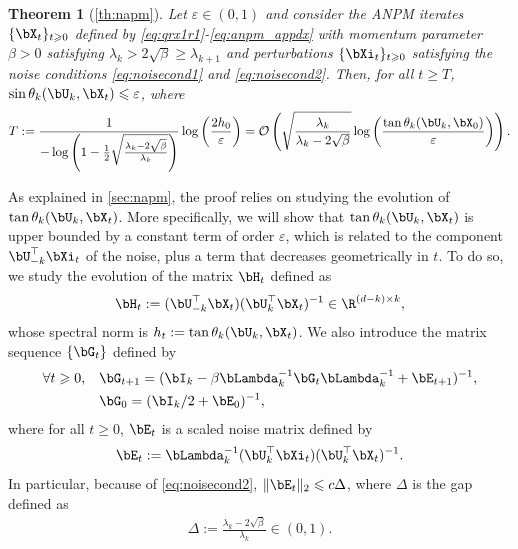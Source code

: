 \documentclass{article}
\theoremstyle{plain}
\newtheorem{theorem}{Theorem}[section]
\theoremstyle{definition}
\theoremstyle{remark}
\begin{document}
\begin{theorem}[\cref{th:napm}]\label{th:napm_apdx}
  Let $\varepsilon \in (0,1)$ and consider the ANPM iterates $\{\bX_t\}_{t\geqslant 0}$ defined by \eqref{eq:qrx1r1}-\eqref{eq:anpm_appdx} with momentum parameter $\beta > 0$ satisfying $\lambda_k > 2\sqrt{\beta} \geqslant \lambda_{k+1}$ and perturbations $\{\bXi_t\}_{t\geqslant 0}$ satisfying the noise conditions \eqref{eq:noisecond1} and \eqref{eq:noisecond2}. Then, for all $t \geqslant T$, $\sin\theta_k(\bU_k, \bX_t) \leqslant \varepsilon$, where
  \begin{align*}
      T := \frac{1}{-\log\left(1 - \frac{1}{2}\sqrt{\frac{\lambda_k-2\sqrt{\beta}}{\lambda_k}}\right)}\log\left(\frac{2h_0}{\varepsilon}\right) = \mathcal{O}\left(\sqrt{\frac{\lambda_k}{\lambda_k - 2\sqrt{\beta}}} \log\left(\frac{\tan\theta_k(\bU_k, \bX_0)}{\varepsilon}\right)\right).
  \end{align*}
\end{theorem}

As explained in \cref{sec:napm}, the proof relies on studying the evolution of $\tan\theta_k(\bU_k,\bX_t)$. More specifically, we will show that $\tan\theta_k(\bU_k,\bX_t)$ is upper bounded by a constant term of order $\varepsilon$, which is related to the component $\bU_{-k}^\top \bXi_t$ of the noise, plus a term that decreases geometrically in $t$. To do so, we study the evolution of the matrix $\bH_t$ defined as 
\begin{align}\label{eq:ht_def_appdx}
    \bH_t := (\bU_{-k}^\top \bX_t) (\bU_k^\top \bX_t)^{-1} \in \R^{(d-k)\times k},
\end{align}
whose spectral norm is $h_t := \tan\theta_k(\bU_k, \bX_t)$. We also introduce the matrix sequence $\{\bG_t\}$ defined by
\begin{align}
  \forall t\geqslant 0, \quad & \bG_{t+1} = (\bI_k - \beta\bLambda^{-1}_k \bG_t \bLambda_k^{-1} + \bE_{t+1})^{-1},    \label{eq:gt_def_appdx} \\
  & \bG_0 = (\bI_k/2 + \bE_0)^{-1}, \nonumber
\end{align} 
where for all $t\geqslant 0$, $\bE_t$ is a scaled noise matrix defined by
\begin{align}
  \bE_t := \bLambda_k^{-1} (\bU_k^\top \bXi_t) (\bU_k^\top \bX_t)^{-1}. \label{eq:et_def_appdx}
\end{align}
In particular, because of \eqref{eq:noisecond2}, $\Vert\bE_t\Vert_2\leqslant c\Delta$, where $\Delta$ is the gap defined as 
\begin{align}
  \Delta := \frac{\lambda_k - 2\sqrt{\beta}}{\lambda_k} \in (0,1).
\end{align}
\end{document}
